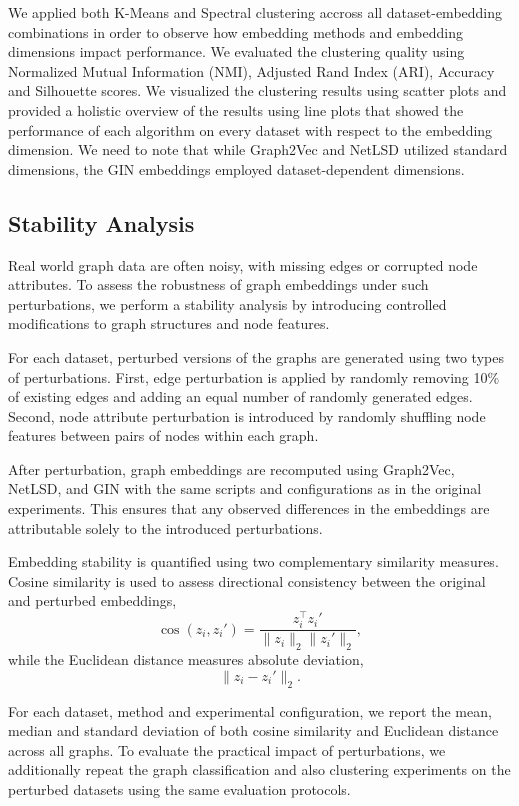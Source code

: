 We applied both K-Means and Spectral clustering accross all dataset-embedding
combinations in order to observe how embedding methods and embedding dimensions
impact performance. We evaluated the clustering quality using 
Normalized Mutual Information (NMI), Adjusted Rand Index (ARI), Accuracy 
and Silhouette scores. We visualized the clustering results using scatter plots
and provided a holistic overview  of the results using line plots that showed the 
performance of each algorithm on every dataset with respect to the embedding dimension.
We need to note that while Graph2Vec and NetLSD utilized standard dimensions, 
the GIN embeddings employed dataset-dependent dimensions.


\subsection{Stability Analysis}
Real world graph data are often noisy, with missing edges or corrupted node attributes.
To assess the robustness of graph embeddings under such perturbations, we perform a
stability analysis by introducing controlled modifications to graph structures and
node features.

For each dataset, perturbed versions of the graphs are generated using two types of
perturbations.
First, edge perturbation is applied by randomly removing 10\% of existing edges and
adding an equal number of randomly generated edges.
Second, node attribute perturbation is introduced by randomly shuffling node features
between pairs of nodes within each graph.

After perturbation, graph embeddings are recomputed using Graph2Vec, NetLSD, and GIN
with the same scripts and configurations as in the original experiments.
This ensures that any observed differences in the embeddings are attributable solely
to the introduced perturbations.

Embedding stability is quantified using two complementary similarity measures.
Cosine similarity is used to assess directional consistency between the original and
perturbed embeddings,
\[
\cos (z_i, z_i') = \frac{z_i^\top z_i'}{\lVert z_i \rVert_2 \lVert z_i' \rVert_2},
\]
while the Euclidean distance measures absolute deviation,
\[
\lVert z_i - z_i' \rVert_2.
\]

For each dataset, method and experimental configuration, we report the mean, median
and standard deviation of both cosine similarity and Euclidean distance across all
graphs.
To evaluate the practical impact of perturbations, we additionally repeat the graph
classification and also clustering experiments on the perturbed datasets using the same
evaluation protocols.
